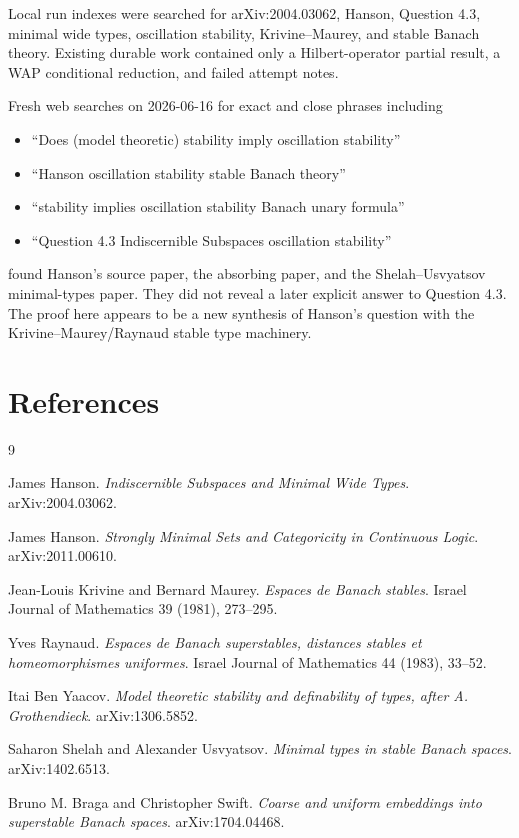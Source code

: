 \documentclass[11pt]{article}
\begin{document}
Local run indexes were searched for arXiv:2004.03062, Hanson, Question 4.3,
minimal wide types, oscillation stability, Krivine--Maurey, and stable Banach
theory. Existing durable work contained only a Hilbert-operator partial result,
a WAP conditional reduction, and failed attempt notes.

Fresh web searches on 2026-06-16 for exact and close phrases including
\begin{itemize}
\item ``Does (model theoretic) stability imply oscillation stability''
\item ``Hanson oscillation stability stable Banach theory''
\item ``stability implies oscillation stability Banach unary formula''
\item ``Question 4.3 Indiscernible Subspaces oscillation stability''
\end{itemize}
found Hanson's source paper, the absorbing paper, and the
Shelah--Usvyatsov minimal-types paper. They did not reveal a later explicit
answer to Question 4.3. The proof here appears to be a new synthesis of
Hanson's question with the Krivine--Maurey/Raynaud stable type machinery.

\section*{References}

\begin{thebibliography}{9}

James Hanson.
\newblock \emph{Indiscernible Subspaces and Minimal Wide Types}.
\newblock arXiv:2004.03062.

James Hanson.
\newblock \emph{Strongly Minimal Sets and Categoricity in Continuous Logic}.
\newblock arXiv:2011.00610.

Jean-Louis Krivine and Bernard Maurey.
\newblock \emph{Espaces de Banach stables}.
\newblock Israel Journal of Mathematics 39 (1981), 273--295.

Yves Raynaud.
\newblock \emph{Espaces de Banach superstables, distances stables et
homeomorphismes uniformes}.
\newblock Israel Journal of Mathematics 44 (1983), 33--52.

Itai Ben Yaacov.
\newblock \emph{Model theoretic stability and definability of types, after
A. Grothendieck}.
\newblock arXiv:1306.5852.

Saharon Shelah and Alexander Usvyatsov.
\newblock \emph{Minimal types in stable Banach spaces}.
\newblock arXiv:1402.6513.

Bruno M. Braga and Christopher Swift.
\newblock \emph{Coarse and uniform embeddings into superstable Banach spaces}.
\newblock arXiv:1704.04468.

\end{thebibliography}
\end{document}
